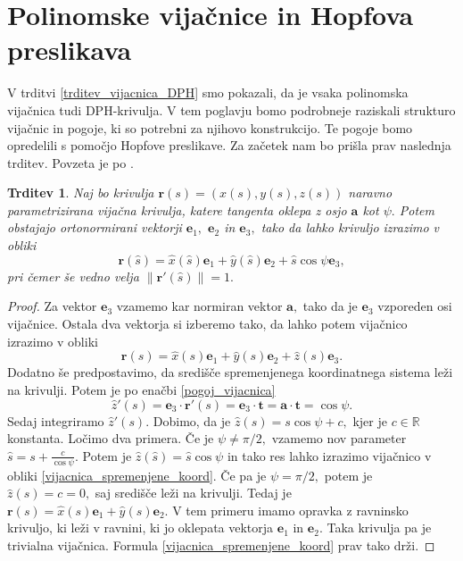 \documentclass[12pt,a4paper,twoside]{article}
\theoremstyle{definition} %
\theoremstyle{plain} %
\newtheorem{trditev}[definicija]{Trditev}
\theoremstyle{primerstyle}
\numberwithin{equation}{section}  %
\newcommand{\R}{\mathbb R}
\newcommand{\tV}{\mathbf{t}}
\newcommand{\aV}{\mathbf{a}}
\newcommand{\eV}{\mathbf{e}}
\newcommand{\rV}{\mathbf{r}}
\begin{document}
\section{Polinomske vijačnice in Hopfova preslikava}

V trditvi \ref{trditev_vijacnica_DPH} smo pokazali, da je vsaka polinomska vijačnica tudi DPH-krivulja. V tem poglavju bomo podrobneje raziskali strukturo vijačnic in pogoje, ki so potrebni za njihovo konstrukcijo. Te pogoje bomo opredelili s pomočjo Hopfove preslikave. Za začetek nam bo prišla prav naslednja trditev. Povzeta je po \cite[str.\ 72]{lipschutz1969schaum}.
\begin{trditev}
	Naj bo krivulja $\rV(s)=(x(s),y(s),z(s))$ naravno parametrizirana vijačna krivulja, katere tangenta oklepa z osjo $\aV$ kot $\psi.$ Potem obstajajo ortonormirani vektorji $\eV_1,$ $\eV_2$ in $\eV_3,$ tako da lahko krivuljo izrazimo v obliki
	\begin{equation}
		\label{vijacnica_spremenjene_koord}
		\rV(\hat{s})=\hat{x}(\hat{s})\eV_1+\hat{y}(\hat{s})\eV_2+\hat{s}\cos\psi\eV_3,
	\end{equation}
	pri čemer še vedno velja $\lVert\rV'(\hat{s})\rVert=1.$
\end{trditev}
\begin{proof}
	Za vektor $\eV_3$ vzamemo kar normiran vektor $\aV,$ tako da je $\eV_3$ vzporeden osi vijačnice. Ostala dva vektorja si izberemo tako, da lahko potem vijačnico izrazimo v obliki
	\begin{equation*}
		\rV(s)=\hat{x}(s)\eV_1+\hat{y}(s)\eV_2+\hat{z}(s)\eV_3.
	\end{equation*}
	Dodatno še predpostavimo, da središče spremenjenega koordinatnega sistema leži na krivulji. Potem je po enačbi \eqref{pogoj_vijacnica} 
	\begin{equation*}
	\hat{z}'(s)=\eV_3\cdot\rV'(s)=\eV_3\cdot\tV=\aV\cdot\tV=\cos\psi.
	\end{equation*}
	Sedaj integriramo $\hat{z}'(s).$ Dobimo, da je $\hat{z}(s)=s\cos\psi+c,$ kjer je $c\in\R$ konstanta. Ločimo dva primera. Če je $\psi\neq \pi/2,$ vzamemo nov parameter $\hat{s}=s+\frac{c}{\cos\psi}.$ Potem je $\hat{z}(\hat{s})=\hat{s}\cos\psi$ in tako res lahko izrazimo vijačnico v obliki \eqref{vijacnica_spremenjene_koord}. Če pa je $\psi=\pi/2,$ potem je $\hat{z}(s)=c=0,$ saj središče leži na krivulji. Tedaj je $\rV(s)=\hat{x}(s)\eV_1+\hat{y}(s)\eV_2.$ V tem primeru imamo opravka z ravninsko krivuljo, ki leži v ravnini, ki jo oklepata vektorja $\eV_1$ in $\eV_2.$ Taka krivulja pa je trivialna vijačnica. Formula \eqref{vijacnica_spremenjene_koord} prav tako drži.
\end{proof}
\end{document}

